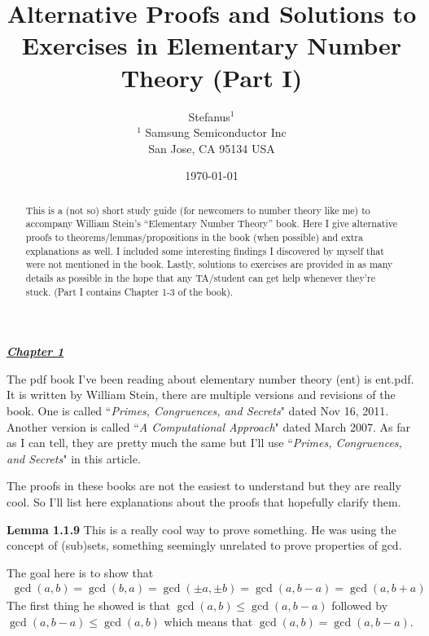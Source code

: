 \documentclass[aps,preprint,preprintnumbers,nofootinbib,showpacs,prd]{revtex4-1}
\newcommand{\nbea}{\begin{eqnarray*}}
\newcommand{\neea}{\end{eqnarray*}}
\begin{document}
\title{Alternative Proofs and Solutions to Exercises in Elementary Number Theory (Part I)}
\bigskip
\author{Stefanus$^1$\\
$^1$ Samsung Semiconductor Inc\\ San Jose, CA 95134 USA\\
}
%
\date{\today}
%
\begin{abstract}
This is a (not so) short study guide (for newcomers to number theory like me) to accompany William Stein's ``Elementary Number Theory'' book. Here I give alternative proofs to theorems/lemmas/propositions in the book (when possible) and extra explanations as well. I included some interesting findings I discovered by myself that were not mentioned in the book. Lastly, solutions to exercises are provided in as many details as possible in the hope that any TA/student can get help whenever they're stuck. (Part I contains Chapter 1-3 of the book).

\end{abstract}
%
\maketitle

\renewcommand{\theequation}{A.\arabic{equation}}  %
\setcounter{equation}{0}  %

\underline{\textbf{\textit{Chapter 1}}}
\bigskip

The pdf book I've been reading about elementary number theory (ent) is ent.pdf. It is written by William Stein, there are multiple versions and revisions of the book. One is called ``{\it Primes, Congruences, and Secrets}" dated Nov 16, 2011. Another version is called ``{\it A Computational Approach}" dated March 2007. As far as I can tell, they are pretty much the same but I'll use ``{\it Primes, Congruences, and Secrets}" in this article.

The proofs in these books are not the easiest to understand but they are really cool. So I'll list here explanations about the proofs that hopefully clarify them.

{\bf Lemma 1.1.9} This is a really cool way to prove something. He was using the concept of (sub)sets, something seemingly unrelated to prove properties of gcd.

The goal here is to show that 
%
\nbea
\gcd(a,b) = \gcd(b,a) = \gcd(\pm a,\pm b) = \gcd(a,b-a) = \gcd(a,b+a)
\neea
%
The first thing he showed is that $\gcd(a,b) \le \gcd(a,b-a)$ followed by $\gcd(a,b-a) \le \gcd(a,b)$ which means that $\gcd(a,b) = \gcd(a,b-a)$.
\end{document}
